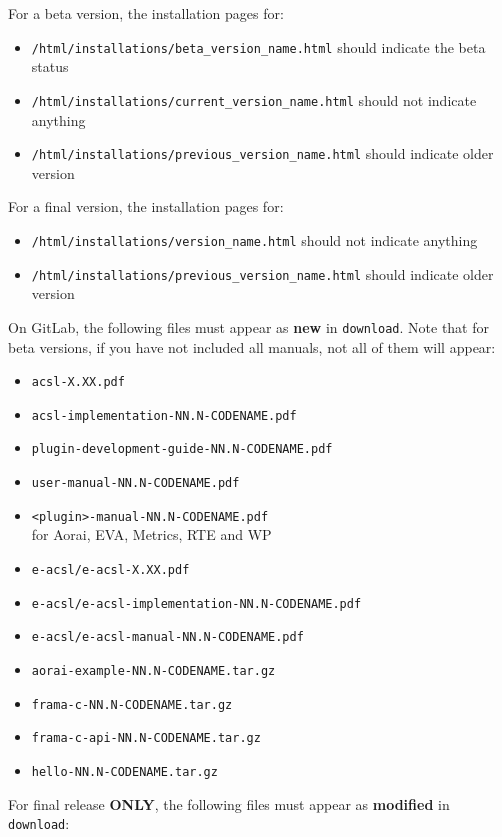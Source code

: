 For a beta version, the installation pages for:
\begin{itemize}
\item \texttt{/html/installations/beta\_version\_name.html} should indicate the beta status
\item \texttt{/html/installations/current\_version\_name.html} should not indicate anything
\item \texttt{/html/installations/previous\_version\_name.html} should indicate older version
\end{itemize}

For a final version, the installation pages for:
\begin{itemize}
\item \texttt{/html/installations/version\_name.html} should not indicate anything
\item \texttt{/html/installations/previous\_version\_name.html} should indicate older version
\end{itemize}

On GitLab, the following files must appear as \textbf{new} in \texttt{download}.
Note that for beta versions, if you have not included all manuals, not all of
them will appear:

\begin{itemize}
  \item \texttt{acsl-X.XX.pdf}
  \item \texttt{acsl-implementation-NN.N-CODENAME.pdf}
  \item \texttt{plugin-development-guide-NN.N-CODENAME.pdf}
  \item \texttt{user-manual-NN.N-CODENAME.pdf}
  \item \texttt{<plugin>-manual-NN.N-CODENAME.pdf}\\
        for Aorai, EVA, Metrics, RTE and WP
  \item \texttt{e-acsl/e-acsl-X.XX.pdf}
  \item \texttt{e-acsl/e-acsl-implementation-NN.N-CODENAME.pdf}
  \item \texttt{e-acsl/e-acsl-manual-NN.N-CODENAME.pdf}
  \item \texttt{aorai-example-NN.N-CODENAME.tar.gz}
  \item \texttt{frama-c-NN.N-CODENAME.tar.gz}
  \item \texttt{frama-c-api-NN.N-CODENAME.tar.gz}
  \item \texttt{hello-NN.N-CODENAME.tar.gz}
\end{itemize}

For final release \textbf{ONLY}, the following files must appear as \textbf{modified} in \texttt{download}:

